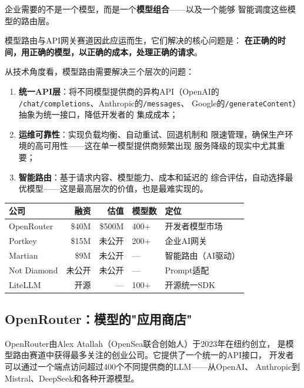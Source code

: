 企业需要的不是一个模型，而是一个\textbf{模型组合}——以及一个能够
智能调度这些模型的路由层。

模型路由与API网关赛道因此应运而生，它们解决的核心问题是：
\textbf{在正确的时间，用正确的模型，以正确的成本，处理正确的请求}。

从技术角度看，模型路由需要解决三个层次的问题：
\begin{enumerate}
  \item \textbf{统一API层}：将不同模型提供商的异构API（OpenAI的
    \texttt{/chat/completions}、Anthropic的\texttt{/messages}、
    Google的\texttt{/generateContent}）抽象为统一接口，降低开发者的
    集成成本；
  \item \textbf{运维可靠性}：实现负载均衡、自动重试、回退机制和
    限速管理，确保生产环境的高可用性——这在单一模型提供商频繁出现
    服务降级的现实中尤其重要；
  \item \textbf{智能路由}：基于请求内容、模型能力、成本和延迟的
    综合评估，自动选择最优模型——这是最高层次的价值，也是最难实现的。
\end{enumerate}

\begin{keybox}[模型路由赛道核心数据对比]
\small
\begin{tabularx}{\textwidth}{l r r l l}
\toprule
\rowcolor{figLightGray}
\textbf{公司} & \textbf{融资} & \textbf{估值} & \textbf{模型数} & \textbf{定位} \\
\midrule
OpenRouter  & \$40M  & \$500M  & 400+  & 开发者模型市场 \\
Portkey     & \$15M  & 未公开  & 200+  & 企业AI网关 \\
Martian     & \$9M   & 未公开  & ---   & 智能路由（AI驱动） \\
Not Diamond & 未公开 & 未公开  & ---   & Prompt适配 \\
LiteLLM     & 开源   & ---     & 100+  & 开源统一SDK \\
\bottomrule
\end{tabularx}
\end{keybox}

\subsection{OpenRouter：模型的"应用商店"}
\label{subsec:openrouter}

OpenRouter由Alex Atallah（OpenSea联合创始人）于2023年在纽约创立，
是模型路由赛道中获得最多关注的创业公司。它提供了一个统一的API接口，
开发者可以通过一个端点访问超过400个不同提供商的LLM——从OpenAI、
Anthropic到Mistral、DeepSeek和各种开源模型。

